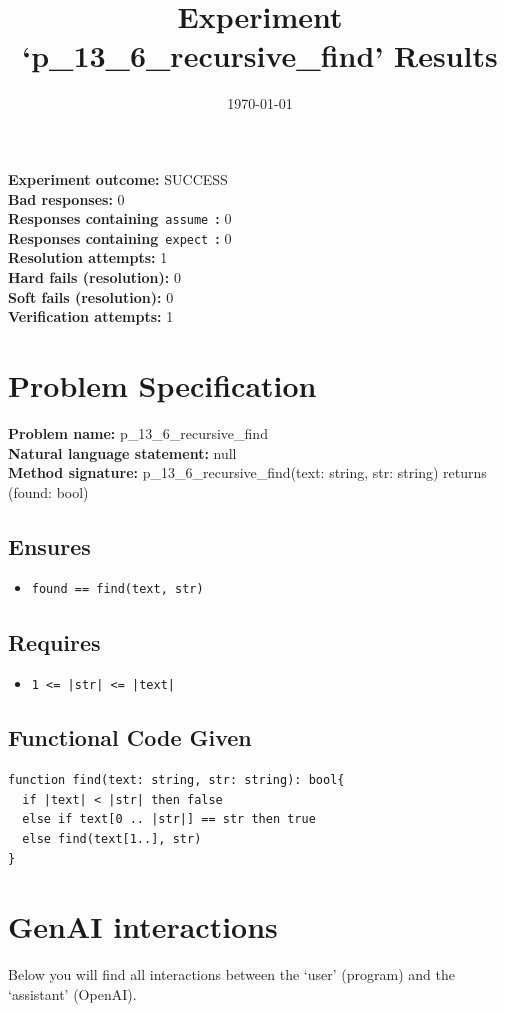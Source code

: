 \documentclass{article}
\begin{document}
\title{Experiment `p\_13\_6\_recursive\_find' Results}
\author{\today}
\date{}
\maketitle
\textbf{Experiment outcome: }SUCCESS
\\\textbf{Bad responses: }0
\\\textbf{Responses containing}~\texttt{assume}~\textbf{: }0
\\\textbf{Responses containing}~\texttt{expect}~\textbf{: }0
\\\textbf{Resolution attempts: }1
\\\textbf{Hard fails (resolution): }0
\\\textbf{Soft fails (resolution): }0
\\\textbf{Verification attempts: }1
\section*{Problem Specification}
\textbf{Problem name: }p\_13\_6\_recursive\_find
\\\textbf{Natural language statement: }null
\\\textbf{Method signature: }p\_13\_6\_recursive\_find(text: string, str: string) returns (found: bool)
\subsection*{Ensures}
\begin{itemize}
\item \texttt{found == find(text, str)}
\end{itemize}
\subsection*{Requires}
\begin{itemize}
\item \texttt{1 <= |str| <= |text|}
\end{itemize}
\subsection*{Functional Code Given}
\begin{lstlisting}
function find(text: string, str: string): bool{
  if |text| < |str| then false
  else if text[0 .. |str|] == str then true
  else find(text[1..], str)
}
\end{lstlisting}
\clearpage
\section*{GenAI interactions}
Below you will find all interactions between the `user' (program) and the `assistant' (OpenAI).
\end{document}

